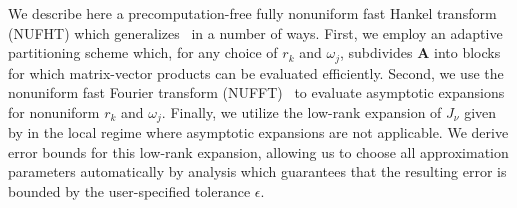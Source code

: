 We describe here a precomputation-free fully nonuniform fast Hankel transform
(NUFHT) which generalizes~\cite{townsend2015fast} in a number of ways. First, we
employ an adaptive partitioning scheme which, for any choice of $r_k$ and
$\omega_j$, subdivides $\bm{A}$ into blocks for which matrix-vector products can
be evaluated efficiently. Second, we use the nonuniform fast Fourier transform
(NUFFT)~\cite{dutt1993fast, greengard2004accelerating} to evaluate asymptotic
expansions for nonuniform $r_k$ and $\omega_j$. Finally, we utilize the low-rank
expansion of $J_\nu$ given by \cite{wimp1962polynomial} in the local regime
where asymptotic expansions are not applicable. We derive error bounds for this
low-rank expansion, allowing us to choose all approximation parameters
automatically by analysis which guarantees that the resulting error is bounded
by the user-specified tolerance $\epsilon$.

